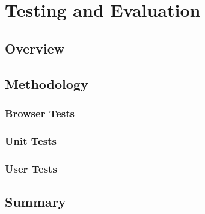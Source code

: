 \section{Testing and Evaluation}
\subsection{Overview}
\subsection{Methodology}
\subsubsection{Browser Tests}
\subsubsection{Unit Tests}
\subsubsection{User Tests}
\subsection{Summary}